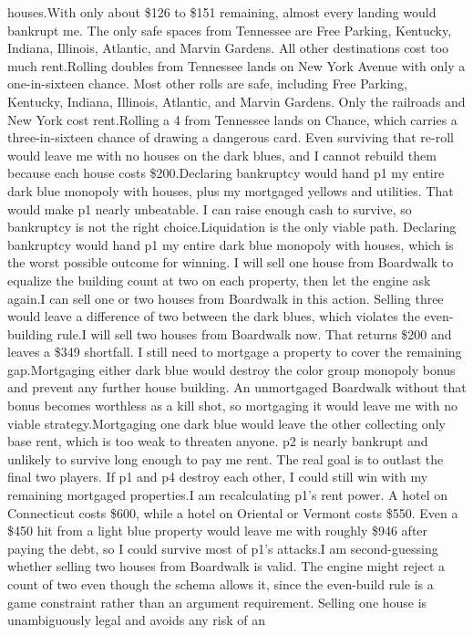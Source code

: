 houses.\newline With only about \$126 to \$151 remaining, almost every landing would bankrupt me. The only safe spaces from Tennessee are Free Parking, Kentucky, Indiana, Illinois, Atlantic, and Marvin Gardens. All other destinations cost too much rent.\newline Rolling doubles from Tennessee lands on New York Avenue with only a one-in-sixteen chance. Most other rolls are safe, including Free Parking, Kentucky, Indiana, Illinois, Atlantic, and Marvin Gardens. Only the railroads and New York cost rent.\newline Rolling a 4 from Tennessee lands on Chance, which carries a three-in-sixteen chance of drawing a dangerous card. Even surviving that re-roll would leave me with no houses on the dark blues, and I cannot rebuild them because each house costs \$200.\newline Declaring bankruptcy would hand p1 my entire dark blue monopoly with houses, plus my mortgaged yellows and utilities. That would make p1 nearly unbeatable. I can raise enough cash to survive, so bankruptcy is not the right choice.\newline Liquidation is the only viable path. Declaring bankruptcy would hand p1 my entire dark blue monopoly with houses, which is the worst possible outcome for winning. I will sell one house from Boardwalk to equalize the building count at two on each property, then let the engine ask again.\newline I can sell one or two houses from Boardwalk in this action. Selling three would leave a difference of two between the dark blues, which violates the even-building rule.\newline I will sell two houses from Boardwalk now. That returns \$200 and leaves a \$349 shortfall. I still need to mortgage a property to cover the remaining gap.\newline Mortgaging either dark blue would destroy the color group monopoly bonus and prevent any further house building. An unmortgaged Boardwalk without that bonus becomes worthless as a kill shot, so mortgaging it would leave me with no viable strategy.\newline Mortgaging one dark blue would leave the other collecting only base rent, which is too weak to threaten anyone. p2 is nearly bankrupt and unlikely to survive long enough to pay me rent. The real goal is to outlast the final two players. If p1 and p4 destroy each other, I could still win with my remaining mortgaged properties.\newline I am recalculating p1's rent power. A hotel on Connecticut costs \$600, while a hotel on Oriental or Vermont costs \$550. Even a \$450 hit from a light blue property would leave me with roughly \$946 after paying the debt, so I could survive most of p1's attacks.\newline I am second-guessing whether selling two houses from Boardwalk is valid. The engine might reject a count of two even though the schema allows it, since the even-build rule is a game constraint rather than an argument requirement. Selling one house is unambiguously legal and avoids any risk of an 